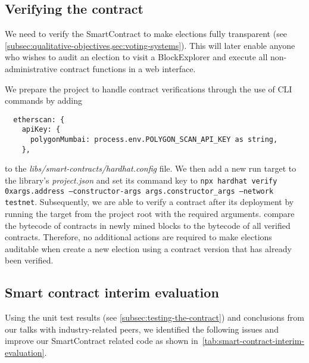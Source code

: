 \subsection{Verifying the contract}\label{subsec:verifying-the-contract}

We need to verify the \gls{SmartContract} to make elections fully transparent (see \cref{subsec:qualitative-objectives,sec:voting-systems}).
This will later enable anyone who wishes to audit an election to visit a \gls{BlockExplorer} and execute all non-administrative contract functions in a web interface.

We prepare the project to handle contract verifications through the use of \gls{CLI} commands by adding

\begin{verbatim}
  etherscan: {
    apiKey: {
      polygonMumbai: process.env.POLYGON_SCAN_API_KEY as string,
    },
\end{verbatim}

to the \emph{libs/smart-contracts/hardhat.config} file.
We then add a new run target to the library's \emph{project.json} and set its command key to \texttt{npx hardhat verify 0x{args.address} --constructor-args {args.constructor_args} --network testnet}.
Subsequently, we are able to verify a contract after its deployment by running the target from the project root with the required arguments.
 compare the bytecode of contracts in newly mined blocks to the bytecode of all verified contracts.
Therefore, no additional actions are required to make elections auditable when  create a new election using a contract version that has already been verified.

\subsection{Smart contract interim evaluation}\label{subsec:smart-contract-interim-evaluation}

Using the unit test results (see \cref{subsec:testing-the-contract}) and conclusions from our talks with industry-related peers, we identified the following issues and improve our \gls{SmartContract} related code as shown in~\cref{tab:smart-contract-interim-evaluation}.


